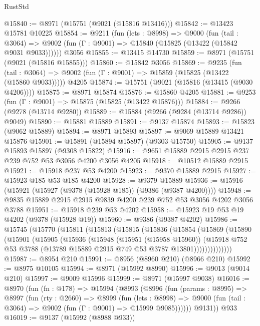 \begin{lexlean}{RustStd}
\begin{coremodule}
@15840 := @8971 (@15751 (@9021 (@15816 @13416)))
@15842 := @13423 @15781 @10225
@15854 := @9211
    (fun (lets : @8998) =>
    @9000
      (fun (tail : @3064) =>
      @9002 (fun (Γ : @9001) => @15840 (@15825 (@13422 (@15842 @9031 @9033))))))
    @3056
@15855 := @13415 @14730
@15859 := @8971 (@15751 (@9021 (@15816 @15855)))
@15860 := @15842 @3056
@15869 := @9235
    (fun (tail : @3064) => @9002 (fun (Γ : @9001) => @15859 (@15825 (@13422 (@15860 @9033)))))
    @4205
@15874 := @15751 (@9021 (@15816 (@13415 (@9030 @4206))))
@15875 := @8971 @15874
@15876 := @15860 @4205
@15881 := @9253 (fun (Γ : @9001) => @15875 (@15825 (@13422 @15876)))
@15884 := @9266 (@9278 (@13714 @9280))
@15889 := @15884 (@9266 (@9284 (@13714 @9286)) @9049)
@15890 := @15881 @15889
@15891 := @9137 @15874
@15893 := @15823 (@9062 @15889)
@15894 := @8971 @15893
@15897 := @9069 @15889 @13421 @15876
@15901 := @15891 (@15894 @15897) (@9303 @15750)
@15905 := @9137 @15893 @15897 (@9308 @15822)
@15916 := @9651 @15889 @2915 @2915 @237 @239 @752 @53 @3056 @4200 @3056 @4205
@15918 := @10512 @15889 @2915
@15921 := @15918 @237 @53 @4200
@15923 := @9370 @15889 @2915
@15927 := @15923 @185 @53 @185 @4200
@15928 := @9379 @15889
@15936 := @15916 (@15921 (@15927 (@9378 (@15928 @185)) (@9386 (@9387 @4200))))
@15948 := @9835 @15889 @2915 @2915 @9839 @4200 @239 @752 @53 @3056 @4202 @3056 @3788
@15951 := @15918 @239 @53 @4202
@15958 := @15923 @19 @53 @19 @4202 (@9378 (@15928 @19))
@15960 := @9386 (@9387 @4202)
@15986 := @15745
    (@15770
      (@15811
        (@15813
          (@15815
            (@15836
              (@15854
                (@15869
                  (@15890
                    (@15901
                      (@15905
                        (@15936
                          (@15948
                            (@15951 (@15958 @15960))
                            (@15918
                              @752
                              @53
                              @3788
                              (@13789 @15889 @2915 @749 @53 @3787 @13801))))))))))))))
@15987 := @8954 @210
@15991 := @8956 (@8960 @210) (@8966 @210)
@15992 := @8975 @10105
@15994 := @8971 (@15992 @8990)
@15996 := @9013 (@9014 @210)
@15997 := @9009 @15996
@15999 := @8971 (@15997 @9038)
@16016 := @8970
    (fun (fn : @178) =>
    @15994
      (@8993
        (@8996
          (fun (params : @8995) =>
          @8997
            (fun (rty : @2660) =>
            @8999
              (fun (lets : @8998) =>
              @9000 (fun (tail : @3064) => @9002 (fun (Γ : @9001) => @15999 @9085))))))
        @9131))
    @933
@16019 := @9137 (@15992 (@8988 @933))

\end{coremodule}
\end{lexlean}
